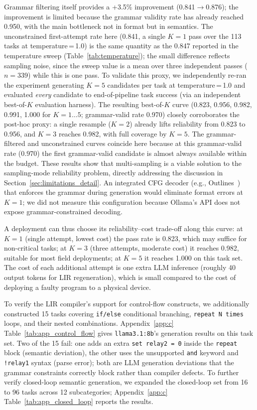 \documentclass[a4paper,fleqn,longmktitle]{cas-dc}
\begin{document}
Grammar filtering itself provides a +3.5\% improvement (0.841$\to$0.876); the improvement is limited because the grammar validity rate has already reached 0.950, with the main bottleneck not in format but in semantics. The unconstrained first-attempt rate here (0.841, a single $K{=}1$ pass over the 113 tasks at temperature\,=\,1.0) is the same quantity as the 0.847 reported in the temperature sweep (Table~\ref{tab:temperature}); the small difference reflects sampling noise, since the sweep value is a mean over three independent passes ($n{=}339$) while this is one pass. To validate this proxy, we independently re-ran the experiment generating $K{=}5$ candidates per task at temperature\,=\,1.0 and evaluated \emph{every} candidate to end-of-pipeline task success (via an independent best-of-$K$ evaluation harness). The resulting best-of-$K$ curve (0.823, 0.956, 0.982, 0.991, 1.000 for $K{=}1\ldots5$; grammar-valid rate 0.970) closely corroborates the post-hoc proxy: a single resample ($K{=}2$) already lifts reliability from 0.823 to 0.956, and $K{=}3$ reaches 0.982, with full coverage by $K{=}5$. The grammar-filtered and unconstrained curves coincide here because at this grammar-valid rate ($0.970$) the first grammar-valid candidate is almost always available within the budget. These results show that multi-sampling is a viable solution to the sampling-mode reliability problem, directly addressing the discussion in Section~\ref{sec:limitations_detail}. An integrated CFG decoder (e.g., Outlines~\citep{outlines}) that enforces the grammar during generation would eliminate format errors at $K{=}1$; we did not measure this configuration because Ollama's API does not expose grammar-constrained decoding.

A deployment can thus choose its reliability--cost trade-off along this curve: at $K{=}1$ (single attempt, lowest cost) the pass rate is 0.823, which may suffice for non-critical tasks; at $K{=}3$ (three attempts, moderate cost) it reaches 0.982, suitable for most field deployments; at $K{=}5$ it reaches 1.000 on this task set. The cost of each additional attempt is one extra LLM inference (roughly 40 output tokens for LIR regeneration), which is small compared to the cost of deploying a faulty program to a physical device.

To verify the LIR compiler's support for control-flow constructs, we additionally constructed 15 tasks covering \texttt{if/else} conditional branching, \texttt{repeat N times} loops, and their nested combinations. Appendix~\ref{app:c} Table~\ref{tab:app_control_flow} gives \texttt{llama3.1:8b}'s generation results on this task set. Two of the 15 fail: one adds an extra \texttt{set relay2 = 0} inside the \texttt{repeat} block (semantic deviation), the other uses the unsupported \texttt{and} keyword and \texttt{!relay1} syntax (parse error); both are LLM generation deviations that the grammar constraints correctly block rather than compiler defects. To further verify closed-loop semantic generation, we expanded the closed-loop set from 16 to 96 tasks across 12 subcategories; Appendix~\ref{app:c} Table~\ref{tab:app_closed_loop} reports the results.
\end{document}

